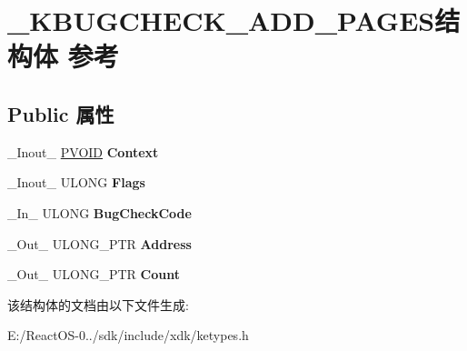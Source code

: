 \hypertarget{struct___k_b_u_g_c_h_e_c_k___a_d_d___p_a_g_e_s}{}\section{\+\_\+\+K\+B\+U\+G\+C\+H\+E\+C\+K\+\_\+\+A\+D\+D\+\_\+\+P\+A\+G\+E\+S结构体 参考}
\label{struct___k_b_u_g_c_h_e_c_k___a_d_d___p_a_g_e_s}
\subsection*{Public 属性}
\begin{DoxyCompactItemize}
\item 
\mbox{\label{struct___k_b_u_g_c_h_e_c_k___a_d_d___p_a_g_e_s_a0732438496ff01d123d5f41cb9c62ec5}} 
\+\_\+\+Inout\+\_\+ \hyperlink{interfacevoid}{P\+V\+O\+ID} {\bfseries Context}
\item 
\mbox{\label{struct___k_b_u_g_c_h_e_c_k___a_d_d___p_a_g_e_s_a8921ee06463916be7879b7eaea124bab}} 
\+\_\+\+Inout\+\_\+ U\+L\+O\+NG {\bfseries Flags}
\item 
\mbox{\label{struct___k_b_u_g_c_h_e_c_k___a_d_d___p_a_g_e_s_a59e6e5900cdd90c9b7813feb2c94a5c8}} 
\+\_\+\+In\+\_\+ U\+L\+O\+NG {\bfseries Bug\+Check\+Code}
\item 
\mbox{\label{struct___k_b_u_g_c_h_e_c_k___a_d_d___p_a_g_e_s_a0dee96dbe14af5df9bde9e3006d0e496}} 
\+\_\+\+Out\+\_\+ U\+L\+O\+N\+G\+\_\+\+P\+TR {\bfseries Address}
\item 
\mbox{\label{struct___k_b_u_g_c_h_e_c_k___a_d_d___p_a_g_e_s_a4c5a94cce5b1a8594249e7f2f1456c9c}} 
\+\_\+\+Out\+\_\+ U\+L\+O\+N\+G\+\_\+\+P\+TR {\bfseries Count}
\end{DoxyCompactItemize}


该结构体的文档由以下文件生成\+:\begin{DoxyCompactItemize}
\item 
E\+:/\+React\+O\+S-\/0../sdk/include/xdk/ketypes.\+h\end{DoxyCompactItemize}
